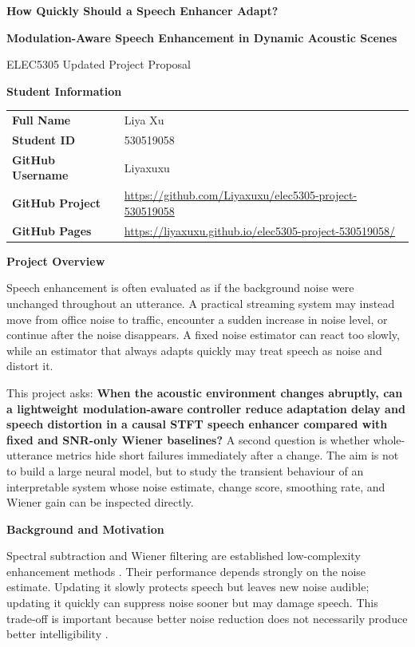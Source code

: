 \documentclass[11pt,a4paper]{article}
\newcommand{\projectsection}[1]{%
  \vspace{0.25em}%
  {\large\bfseries\color{accent} #1}\par
  \vspace{0.1em}%
}
\begin{document}
\begin{center}
  {\LARGE\bfseries\color{textgray}
  How Quickly Should a Speech Enhancer Adapt?\par}
  \vspace{0.25em}
  {\Large\bfseries\color{textgray}
  Modulation-Aware Speech Enhancement in Dynamic Acoustic Scenes\par}
  \vspace{0.7em}
  {\large ELEC5305 Updated Project Proposal}
\end{center}

\projectsection{Student Information}

\begin{tabularx}{\textwidth}{@{}>{\bfseries}l X@{}}
Full Name & Liya Xu \\
Student ID & 530519058 \\
GitHub Username & Liyaxuxu \\
GitHub Project & {\small\url{https://github.com/Liyaxuxu/elec5305-project-530519058}} \\[0.3em]
GitHub Pages & {\small\url{https://liyaxuxu.github.io/elec5305-project-530519058/}} \\
\end{tabularx}

\projectsection{Project Overview}

Speech enhancement is often evaluated as if the background noise were unchanged throughout an utterance. A practical streaming system may instead move from office noise to traffic, encounter a sudden increase in noise level, or continue after the noise disappears. A fixed noise estimator can react too slowly, while an estimator that always adapts quickly may treat speech as noise and distort it.

This project asks: \textbf{When the acoustic environment changes abruptly, can a lightweight modulation-aware controller reduce adaptation delay and speech distortion in a causal STFT speech enhancer compared with fixed and SNR-only Wiener baselines?} A second question is whether whole-utterance metrics hide short failures immediately after a change. The aim is not to build a large neural model, but to study the transient behaviour of an interpretable system whose noise estimate, change score, smoothing rate, and Wiener gain can be inspected directly.

\projectsection{Background and Motivation}

Spectral subtraction and Wiener filtering are established low-complexity enhancement methods \cite{boll1979,scalart1996}. Their performance depends strongly on the noise estimate. Updating it slowly protects speech but leaves new noise audible; updating it quickly can suppress noise sooner but may damage speech. This trade-off is important because better noise reduction does not necessarily produce better intelligibility \cite{loizou2011}.
\end{document}
